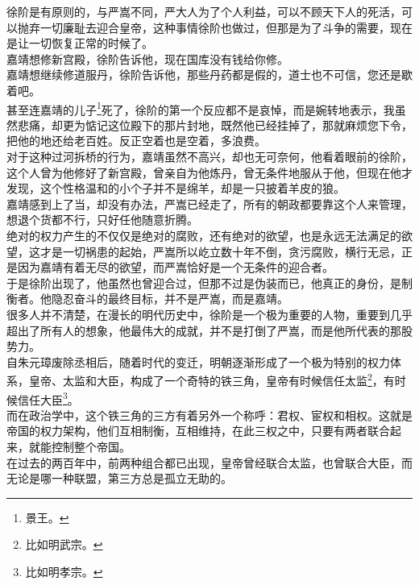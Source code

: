 \begin{multicols}{\theparacolNo}
徐阶是有原则的，与严嵩不同，严大人为了个人利益，可以不顾天下人的死活，可以抛弃一切廉耻去迎合皇帝，这种事情徐阶也做过，但那是为了斗争的需要，现在是让一切恢复正常的时候了。\\

嘉靖想修新宫殿，徐阶告诉他，现在国库没有钱给你修。\\

嘉靖想继续修道服丹，徐阶告诉他，那些丹药都是假的，道士也不可信，您还是歇着吧。\\

甚至连嘉靖的儿子\footnote{景王。}死了，徐阶的第一个反应都不是哀悼，而是婉转地表示，我虽然悲痛，却更为惦记这位殿下的那片封地，既然他已经挂掉了，那就麻烦您下令，把他的地还给老百姓。反正空着也是空着，多浪费。\\

对于这种过河拆桥的行为，嘉靖虽然不高兴，却也无可奈何，他看着眼前的徐阶，这个人曾为他修好了新宫殿，曾亲自为他炼丹，曾无条件地服从于他，但现在他才发现，这个性格温和的小个子并不是绵羊，却是一只披着羊皮的狼。\\

嘉靖感到上了当，却没有办法，严嵩已经走了，所有的朝政都要靠这个人来管理，想退个货都不行，只好任他随意折腾。\\

绝对的权力产生的不仅仅是绝对的腐败，还有绝对的欲望，也是永远无法满足的欲望，这才是一切祸患的起始，严嵩所以屹立数十年不倒，贪污腐败，横行无忌，正是因为嘉靖有着无尽的欲望，而严嵩恰好是一个无条件的迎合者。\\

于是徐阶出现了，他虽然也曾迎合过，但那不过是伪装而已，他真正的身份，是制衡者。他隐忍奋斗的最终目标，并不是严嵩，而是嘉靖。\\

很多人并不清楚，在漫长的明代历史中，徐阶是一个极为重要的人物，重要到几乎超出了所有人的想象，他最伟大的成就，并不是打倒了严嵩，而是他所代表的那股势力。\\

自朱元璋废除丞相后，随着时代的变迁，明朝逐渐形成了一个极为特别的权力体系，皇帝、太监和大臣，构成了一个奇特的铁三角，皇帝有时候信任太监\footnote{比如明武宗。}，有时候信任大臣\footnote{比如明孝宗。}。\\

而在政治学中，这个铁三角的三方有着另外一个称呼：君权、宦权和相权。这就是帝国的权力架构，他们互相制衡，互相维持，在此三权之中，只要有两者联合起来，就能控制整个帝国。\\

在过去的两百年中，前两种组合都已出现，皇帝曾经联合太监，也曾联合大臣，而无论是哪一种联盟，第三方总是孤立无助的。\\


\end{multicols}
